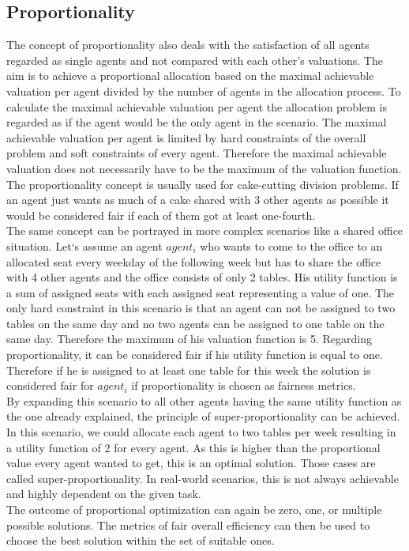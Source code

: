\documentclass[german, a4paper, 11pt, oneside]{scrbook}
\begin{document}
\subsection{Proportionality}
The concept of proportionality also deals with the satisfaction of all agents regarded as single agents and not compared with each other's valuations. The aim is to achieve a proportional allocation based on the maximal achievable valuation per agent divided by the number of agents in the allocation process. To calculate the maximal achievable valuation per agent the allocation problem is regarded as if the agent would be the only agent in the scenario. \cite{FelixBrandtVincentConitzerUlleEndrissJeromeLangandArielD.Procaccia.} The maximal achievable valuation per agent is limited by hard constraints of the overall problem and soft constraints of every agent. Therefore the maximal achievable valuation does not necessarily have to be the maximum of the valuation function. The proportionality concept is usually used for cake-cutting division problems. If an agent just wants as much of a cake shared with 3 other agents as possible it would be considered fair if each of them got at least one-fourth. \\The same concept can be portrayed in more complex scenarios like a shared office situation. Let`s assume an agent $agent_i$ who wants to come to the office to an allocated seat every weekday of the following week but has to share the office with 4 other agents and the office consists of only 2 tables. His utility function is a sum of assigned seats with each assigned seat representing a value of one. The only hard constraint in this scenario is that an agent can not be assigned to two tables on the same day and no two agents can be assigned to one table on the same day. Therefore the maximum of his valuation function is 5.  Regarding proportionality, it can be considered fair if his utility function is equal to one. Therefore if he is assigned to at least one table for this week the solution is considered fair for $agent_i$ if proportionality is chosen as fairness metrics. \\By expanding this scenario to all other agents having the same utility function as the one already explained, the principle of super-proportionality can be achieved. In this scenario, we could allocate each agent to two tables per week resulting in a utility function of 2 for every agent. As this is higher than the proportional value every agent wanted to get, this is an optimal solution. Those cases are called super-proportionality. In real-world scenarios, this is not always achievable and highly dependent on the given task. \\The outcome of proportional optimization can again be zero, one, or multiple possible solutions. The metrics of fair overall efficiency can then be used to choose the best solution within the set of suitable ones. 
\end{document}
